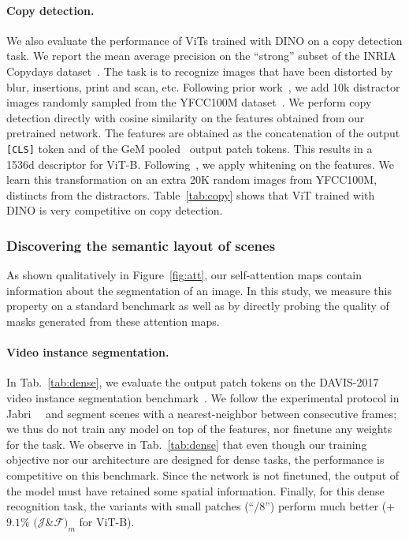 \paragraph{Copy detection.} We also evaluate the performance of ViTs trained with DINO on a copy detection task. We report the mean average precision on the ``strong'' subset of the INRIA Copydays dataset~\cite{douze2009evaluation}. The task is to recognize images that have been distorted by blur, insertions, print and scan, etc. Following prior work~\cite{berman2019multigrain}, we add 10k distractor images randomly sampled from the YFCC100M dataset~\cite{thomee2015yfcc100m}. We perform copy detection directly with cosine similarity on the features obtained from our pretrained network. The features are obtained as the concatenation of the output \texttt{[CLS]} token and of the GeM pooled~\cite{radenovic2018fine} output patch tokens. This results in a 1536d descriptor for ViT-B. Following~\cite{berman2019multigrain}, we apply whitening on the features. We learn this transformation on an extra 20K random images from YFCC100M, distincts from the distractors.
Table~\ref{tab:copy} shows that ViT trained with DINO is very competitive on copy detection.

\subsubsection{Discovering the semantic layout of scenes}

As shown qualitatively in Figure~\ref{fig:att}, our self-attention maps contain information about the segmentation of an image. In this study, we measure this property on a standard benchmark as well as by directly probing the quality of masks generated from these attention maps.

\paragraph{Video instance segmentation.}

In Tab.~\ref{tab:dense}, we evaluate the output patch tokens on the DAVIS-2017 video instance segmentation benchmark~\cite{pont20172017}. We follow the experimental protocol in Jabri~\etal~\cite{jabri2020space} and segment scenes with a nearest-neighbor between consecutive frames; we thus do not train any model on top of the features, nor finetune any weights for the task. We observe in Tab.~\ref{tab:dense} that even though our training objective nor our architecture are designed for dense tasks, the performance is competitive on this benchmark. Since the network is not finetuned, the output of the model must have retained some spatial information. Finally, for this dense recognition task, the variants with small patches (``/8'') perform much better (+$9.1\%$ $(\mathcal{J}$\&$\mathcal{F})_m$ for ViT-B).

